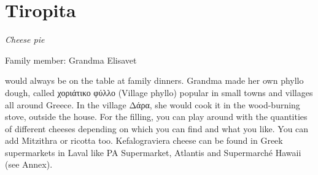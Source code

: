 \chapter{Tiropita}
\label{ch:tiropita}


\textit{Cheese pie}

Family member: Grandma Elisavet

 would always be on the table at family dinners. Grandma made her own phyllo dough, called \textgreek{χοριάτικο φύλλο} (Village phyllo) popular in small towns and villages all around Greece. In the village \textgreek{Δάρα}, she would cook it in the wood-burning stove, outside the house. For the filling, you can play around with the quantities of different cheeses depending on which you can find and what you like. You can add Mitzithra or ricotta too. Kefalograviera cheese can be found in Greek supermarkets in Laval like PA Supermarket, Atlantis and Supermarché Hawaii (see Annex).  %

